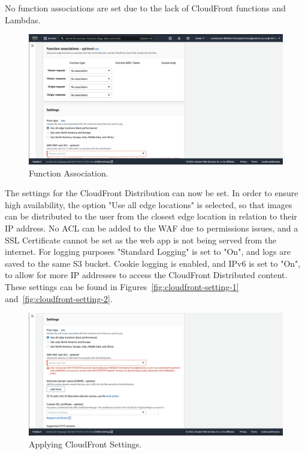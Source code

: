 No function associations are set due to the lack of CloudFront functions and Lambdas.

\begin{figure}[!htbp]
    \centering
    \includegraphics[width=\textwidth]{resources/cloudfront/cloudfront-function-association}
    \caption{Function Association.}
    \label{fig:cloudfront-function-association}
\end{figure}

The settings for the CloudFront Distribution can now be set.
In order to ensure high availability, the option "Use all edge locations" is selected, so that images can be distributed
to the user from the closest edge location in relation to their IP address.
No ACL can be added to the WAF due to permissions issues, and a SSL Certificate cannot be set as the web app is not being
served from the internet.
For logging purposes "Standard Logging" is set to "On", and logs are saved to the same S3 bucket.
Cookie logging is enabled, and IPv6 is set to "On", to allow for more IP addresses to access the CloudFront Distributed
content.
These settings can be found in Figures~\ref{fig:cloudfront-setting-1} and~\ref{fig:cloudfront-setting-2}.

\clearpage

\begin{figure}[!htbp]
    \centering
    \includegraphics[width=\textwidth]{resources/cloudfront/cloudfront-settings-1}
    \caption{Applying CloudFront Settings.}
    \label{fig:cloudfront-settings-1}
\end{figure}


